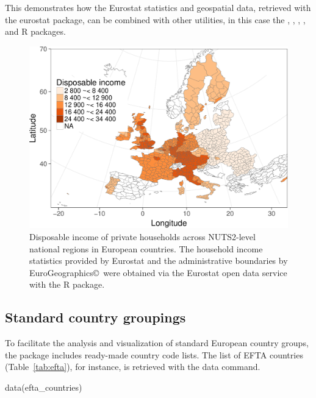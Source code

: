 This demonstrates how the Eurostat statistics and geospatial data, retrieved with the eurostat package, can be combined with other utilities, in this case the  \citep{maptools},  \citep{rgdal},  \citep{rgeos},  \citep{scales}, and  \citep{stringr} R packages.


\begin{figure}
\begin{center}
\includegraphics{2017-manu-mapexample-1}
\caption{Disposable income of private households across NUTS2-level national regions in European countries. The household income statistics provided by Eurostat and the administrative boundaries by EuroGeographics\copyright \  were obtained via the Eurostat open data service with the  R package.}
\label{fig:mapexample}
\end{center}
\end{figure}


\subsection{Standard country groupings}

To facilitate the analysis and visualization of standard European
country groups, the  package includes ready-made
country code lists. The list of EFTA countries (Table~\ref{tab:efta}),
for instance, is retrieved with the data command.

\begin{example}
  data(efta_countries)
\end{example}

